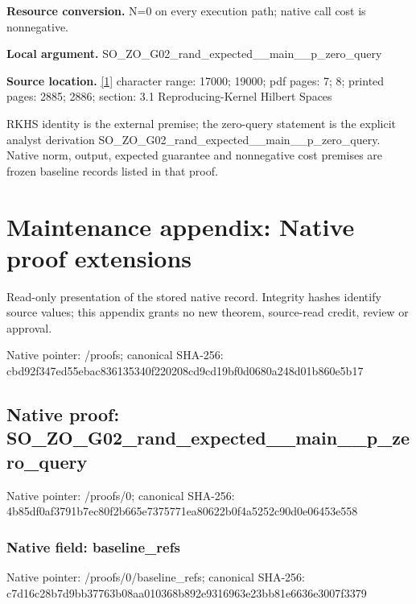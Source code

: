 \documentclass[10pt,a4paper]{article}
\begin{document}
\textbf{Resource conversion.} N=0 on every execution path; native call cost is nonnegative.

\textbf{Local argument.} SO\_\allowbreak{}ZO\_\allowbreak{}G02\_\allowbreak{}rand\_\allowbreak{}expected\_\allowbreak{}\_\allowbreak{}main\_\allowbreak{}\_\allowbreak{}p\_\allowbreak{}zero\_\allowbreak{}query

\textbf{Source location.} \href{https://www.jmlr.org/papers/volume12/bull11a/bull11a.pdf}{[1]} character range: 17000; 19000; pdf pages: 7; 8; printed pages: 2885; 2886; section: 3.1 Reproducing-Kernel Hilbert Spaces

RKHS identity is the external premise; the zero-query statement is the explicit analyst derivation SO\_\allowbreak{}ZO\_\allowbreak{}G02\_\allowbreak{}rand\_\allowbreak{}expected\_\allowbreak{}\_\allowbreak{}main\_\allowbreak{}\_\allowbreak{}p\_\allowbreak{}zero\_\allowbreak{}query. Native norm, output, expected guarantee and nonnegative cost premises are frozen baseline records listed in that proof.

\section{Maintenance appendix: Native proof extensions}
Read-only presentation of the stored native record. Integrity hashes identify source values; this appendix grants no new theorem, source-read credit, review or approval.

Native pointer: /proofs; canonical SHA-256: cbd92f347ed55ebac836135340f220208cd9cd19bf0d0680a248d01b860e5b17

\subsection{Native proof: SO\_\allowbreak{}ZO\_\allowbreak{}G02\_\allowbreak{}rand\_\allowbreak{}expected\_\allowbreak{}\_\allowbreak{}main\_\allowbreak{}\_\allowbreak{}p\_\allowbreak{}zero\_\allowbreak{}query}
Native pointer: /proofs/0; canonical SHA-256: 4b85df0af3791b7ec80f2b665e7375771ea80622b0f4a5252c90d0e06453e558

\subsubsection{Native field: baseline\_\allowbreak{}refs}
Native pointer: /proofs/0/baseline\_\allowbreak{}refs; canonical SHA-256: c7d16c28b7d9bb37763b08aa010368b892e9316963e23bb81e6636e3007f3379
\end{document}
